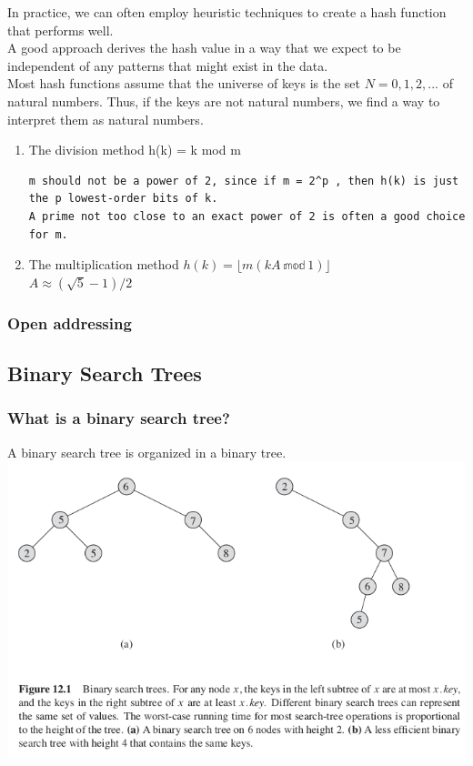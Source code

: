 \documentclass[11pt]{article}
\begin{document}
In practice, we can often employ heuristic techniques to create a hash function that performs well. \\

A good approach derives the hash value in a way that we expect to be independent of any patterns that might exist in the data. \\

Most hash functions assume that the universe of keys is the set $N={0,1,2,...}$ of natural numbers. Thus, if the keys are not natural numbers, we find a way to interpret them as natural numbers. \\

\begin{enumerate}
\item The division method
\label{sec-4-2-3-1}
h(k) = k mod m \\

\begin{verbatim}
m should not be a power of 2, since if m = 2^p , then h(k) is just the p lowest-order bits of k.
A prime not too close to an exact power of 2 is often a good choice for m.
\end{verbatim}
\item The multiplication method
\label{sec-4-2-3-2}
$h(k) = \lfloor m(kA\ \mathbb{mod}\ 1) \rfloor$ \\
$A \approx (\sqrt{5} - 1)/2$ \\
\end{enumerate}
\subsubsection{Open addressing}
\label{sec-4-2-4}

\subsection{Binary Search Trees}
\label{sec-4-3}

\subsubsection{What is a binary search tree?}
\label{sec-4-3-1}
A binary search tree is organized in a binary tree. \\

\includegraphics[width=.9\linewidth]{pics/c12_binary_search_tree.png} \\
\end{document}
